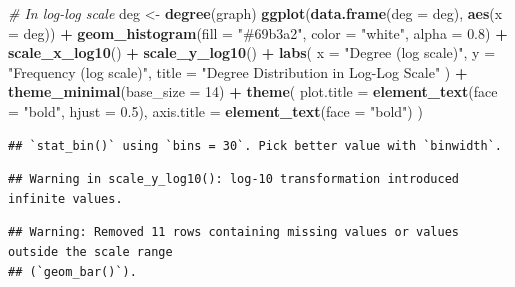 \documentclass[
]{article}
\newenvironment{Shaded}{\begin{snugshade}}{\end{snugshade}}
\newcommand{\AttributeTok}[1]{\textcolor[rgb]{0.13,0.29,0.53}{#1}}
\newcommand{\CommentTok}[1]{\textcolor[rgb]{0.56,0.35,0.01}{\textit{#1}}}
\newcommand{\DecValTok}[1]{\textcolor[rgb]{0.00,0.00,0.81}{#1}}
\newcommand{\FloatTok}[1]{\textcolor[rgb]{0.00,0.00,0.81}{#1}}
\newcommand{\FunctionTok}[1]{\textcolor[rgb]{0.13,0.29,0.53}{\textbf{#1}}}
\newcommand{\NormalTok}[1]{#1}
\newcommand{\OtherTok}[1]{\textcolor[rgb]{0.56,0.35,0.01}{#1}}
\newcommand{\SpecialCharTok}[1]{\textcolor[rgb]{0.81,0.36,0.00}{\textbf{#1}}}
\newcommand{\StringTok}[1]{\textcolor[rgb]{0.31,0.60,0.02}{#1}}
\begin{document}
\begin{Shaded}
\begin{Highlighting}[]
\CommentTok{\# In log{-}log scale}
\NormalTok{deg }\OtherTok{\textless{}{-}} \FunctionTok{degree}\NormalTok{(graph)}
\FunctionTok{ggplot}\NormalTok{(}\FunctionTok{data.frame}\NormalTok{(}\AttributeTok{deg =}\NormalTok{ deg), }\FunctionTok{aes}\NormalTok{(}\AttributeTok{x =}\NormalTok{ deg)) }\SpecialCharTok{+}
  \FunctionTok{geom\_histogram}\NormalTok{(}\AttributeTok{fill =} \StringTok{"\#69b3a2"}\NormalTok{, }\AttributeTok{color =} \StringTok{"white"}\NormalTok{, }\AttributeTok{alpha =} \FloatTok{0.8}\NormalTok{) }\SpecialCharTok{+}
  \FunctionTok{scale\_x\_log10}\NormalTok{() }\SpecialCharTok{+}
  \FunctionTok{scale\_y\_log10}\NormalTok{() }\SpecialCharTok{+}
  \FunctionTok{labs}\NormalTok{(}
    \AttributeTok{x =} \StringTok{"Degree (log scale)"}\NormalTok{,}
    \AttributeTok{y =} \StringTok{"Frequency (log scale)"}\NormalTok{,}
    \AttributeTok{title =} \StringTok{"Degree Distribution in Log{-}Log Scale"}
\NormalTok{  ) }\SpecialCharTok{+}
  \FunctionTok{theme\_minimal}\NormalTok{(}\AttributeTok{base\_size =} \DecValTok{14}\NormalTok{) }\SpecialCharTok{+}
  \FunctionTok{theme}\NormalTok{(}
    \AttributeTok{plot.title =} \FunctionTok{element\_text}\NormalTok{(}\AttributeTok{face =} \StringTok{"bold"}\NormalTok{, }\AttributeTok{hjust =} \FloatTok{0.5}\NormalTok{),}
    \AttributeTok{axis.title =} \FunctionTok{element\_text}\NormalTok{(}\AttributeTok{face =} \StringTok{"bold"}\NormalTok{)}
\NormalTok{  )}
\end{Highlighting}
\end{Shaded}

\begin{verbatim}
## `stat_bin()` using `bins = 30`. Pick better value with `binwidth`.
\end{verbatim}

\begin{verbatim}
## Warning in scale_y_log10(): log-10 transformation introduced infinite values.
\end{verbatim}

\begin{verbatim}
## Warning: Removed 11 rows containing missing values or values outside the scale range
## (`geom_bar()`).
\end{verbatim}
\end{document}
